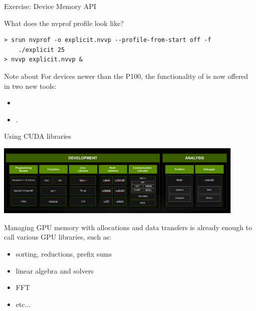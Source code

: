 \documentclass[aspectratio=43]{beamer}
\begin{document}
\begin{frame}[fragile]{Exercise: Device Memory API}

What does the nvprof profile look like?

\begin{terminal}{}
\begin{lstlisting}[style=terminal]
> srun nvprof -o explicit.nvvp --profile-from-start off -f
    ./explicit 25
> nvvp explicit.nvvp &
\end{lstlisting}
\end{terminal}

\begin{info}{Note about }
For devices newer than the P100, the functionality of 
is now offered in two new tools:
  \begin{itemize}
    \item {}
    \item {}.
  \end{itemize}
\end{info}

\end{frame}

\begin{frame}[fragile]{Using CUDA libraries}
    \begin{center}
        \includegraphics[width=0.9\textwidth]{./image_png/nvidia_libraries.png}
    \end{center}
Managing GPU memory with allocations and data transfers is already enough to
call various GPU libraries, such as:
\begin{itemize}
  \item sorting, reductions, prefix sums
  \item linear algebra and solvers
  \item FFT
  \item etc...
\end{itemize}
\end{frame}
\end{document}
